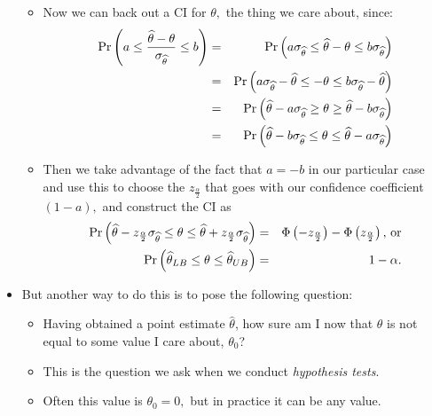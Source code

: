 \documentclass[11pt]{article}
\begin{document}
\begin{itemize}
\begin{itemize}
\item Now we can back out a CI for $\theta ,$ the thing we care about, since:%
\begin{eqnarray*}
\Pr \left( a\leq \frac{\widehat{\theta }-\theta }{\sigma _{\widehat{\theta }}%
}\leq b\right)  &=&\Pr \left( a\sigma _{\widehat{\theta }}\leq \widehat{%
\theta }-\theta \leq b\sigma _{\widehat{\theta }}\right)  \\
&=&\Pr \left( a\sigma _{\widehat{\theta }}-\widehat{\theta }\leq -\theta
\leq b\sigma _{\widehat{\theta }}-\widehat{\theta }\right)  \\
&=&\Pr \left( \widehat{\theta }-a\sigma _{\widehat{\theta }}\geq \theta \geq 
\widehat{\theta }-b\sigma _{\widehat{\theta }}\right)  \\
&=&\Pr \left( \widehat{\theta }-b\sigma _{\widehat{\theta }}\leq \theta \leq 
\widehat{\theta }-a\sigma _{\widehat{\theta }}\right) 
\end{eqnarray*}

\item Then we take advantage of the fact that $a=-b$ in our particular case
and use this to choose the $z_{\frac{\alpha }{2}}$ that goes with our
confidence coefficient $\left( 1-a\right) ,$ and construct the CI as%
\begin{eqnarray*}
\Pr \left( \widehat{\theta }-z_{\frac{\alpha }{2}}\sigma _{\widehat{\theta }%
}\leq \theta \leq \widehat{\theta }+z_{\frac{\alpha }{2}}\sigma _{\widehat{%
\theta }}\right)  &=&\Phi \left( -z_{\frac{\alpha }{2}}\right) -\Phi \left(
z_{\frac{\alpha }{2}}\right) \text{, or} \\
\Pr \left( \widehat{\theta }_{LB}\leq \theta \leq \widehat{\theta }%
_{UB}\right)  &=&1-\alpha .
\end{eqnarray*}
\end{itemize}

\item But another way to do this is to pose the following question:

\begin{itemize}
\item Having obtained a point estimate $\widehat{\theta }$, how sure am I
now that $\theta $ is not equal to some value I care about, $\theta _{0}$? \ 

\item This is the question we ask when we conduct \textit{hypothesis tests}.

\item Often this value is $\theta _{0}=0,$ but in practice it can be any
value.


\end{itemize}
\end{itemize}
\end{document}
